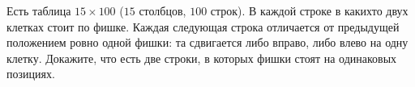 Есть таблица $15 \times 100$ ($15$ столбцов, $100$ строк). В каждой строке в какихто двух клетках стоит по фишке. Каждая следующая строка отличается от предыдущей положением ровно одной фишки: та сдвигается либо вправо, либо влево на одну клетку. Докажите, что есть две строки, в которых фишки стоят на одинаковых позициях.